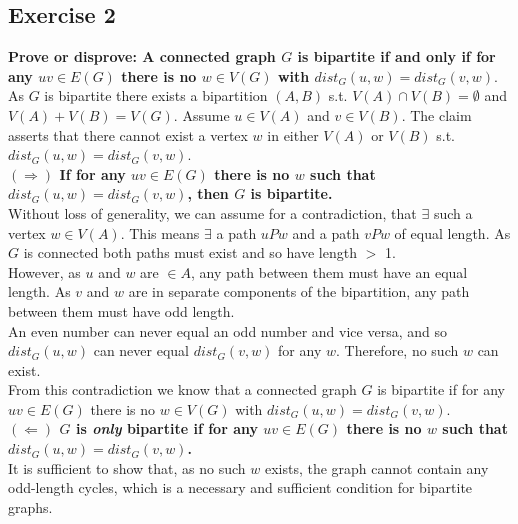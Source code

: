 \subsection*{Exercise 2}
\boldmath
\textbf{Prove or disprove: A connected graph $G$ is bipartite if and only if for any $uv \in E(G)$ there is no $w \in V(G)$ with $dist_G(u,w) = dist_G(v,w).$} \\
\unboldmath 
\linebreak 
As $G$ is bipartite there exists a bipartition $(A, B)$ s.t. $V(A) \cap V(B) = \emptyset$ and $V(A) + V(B) = V(G).$  Assume $u \in V(A)$ and $v \in V(B)$. The claim asserts that there cannot exist a vertex $w$ in either $V(A)$ or $V(B)$ s.t. $dist_G(u, w) = dist_G(v, w)$. \\
\linebreak 
\boldmath
\textbf{$(\Rightarrow)$ If for any $uv \in E(G)$ there is no $w$ such that $dist_G(u,w) = dist_G(v,w)$, then $G$ is bipartite.} \\
\unboldmath
\linebreak 
Without loss of generality, we can assume for a contradiction, that $\exists$ such a vertex $w \in V(A)$. This means $\exists$ a path $uPw$ and a path $vPw$ of equal length. As $G$ is connected both paths must exist and so have length 
$>$ 1. \\
\linebreak
However, as $u$ and $w$ are $\in A$, any path between them must have an equal length. As $v$ and $w$ are in separate components of the bipartition, any path between them must have odd length. \\
\linebreak 
An even number can never equal an odd number and vice versa, and so $dist_G(u, w)$ can never equal $dist_G(v, w)$ for any $w$. Therefore, no such $w$ can exist.\\
\linebreak 
From this contradiction we know that a connected graph $G$ is bipartite if for any $uv \in E(G)$ there is no $w \in V(G)$ with $dist_G(u,w) = dist_G(v,w)$. \\
\linebreak 
\boldmath
\textbf{$(\Leftarrow)$ $G$ is \textit{only} bipartite if for any $uv \in E(G)$ there is no $w$ such that $dist_G(u,w) = dist_G(v,w)$.}  \\
\unboldmath
\linebreak 
It is sufficient to show that, as no such $w$ exists, the graph cannot contain any odd-length cycles, which is a necessary and sufficient condition for bipartite graphs. \\
